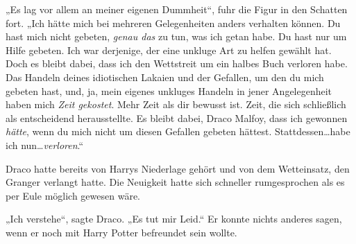 „Es lag vor allem an meiner eigenen Dummheit“, fuhr die Figur in den Schatten fort. „Ich hätte mich bei mehreren Gelegenheiten anders verhalten können. Du hast mich nicht gebeten, \emph{genau das} zu tun, was ich getan habe. Du hast nur um Hilfe gebeten. Ich war derjenige, der eine unkluge Art zu helfen gewählt hat. Doch es bleibt dabei, dass ich den Wettstreit um ein halbes Buch verloren habe. Das Handeln deines idiotischen Lakaien und der Gefallen, um den du mich gebeten hast, und, ja, mein eigenes unkluges Handeln in jener Angelegenheit haben mich \emph{Zeit gekostet}. Mehr Zeit als dir bewusst ist. Zeit, die sich schließlich als entscheidend herausstellte. Es bleibt dabei, Draco Malfoy, dass ich gewonnen \emph{hätte}, wenn du mich nicht um diesen Gefallen gebeten hättest. Stattdessen…habe ich nun…\emph{verloren}.“

Draco hatte bereits von Harrys Niederlage gehört und von dem Wetteinsatz, den Granger verlangt hatte. Die Neuigkeit hatte sich schneller rumgesprochen als es per Eule möglich gewesen wäre.

„Ich verstehe“, sagte Draco. „Es tut mir Leid.“ Er konnte nichts anderes sagen, wenn er noch mit Harry Potter befreundet sein wollte.

